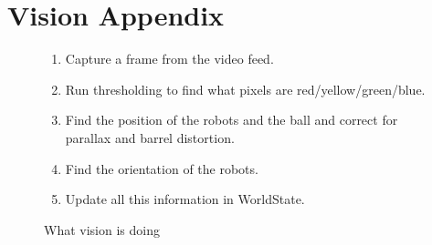 \section{Vision Appendix}
\label{apx:vision}

\begin{figure}[h!]
    \caption{What vision is doing}
    \label{overview}
    \centering
        \begin{enumerate}
            \item Capture a frame from the video feed.
            \item Run thresholding to find what pixels are red/yellow/green/blue.
            \item Find the position of the robots and the ball and correct for parallax and barrel distortion.
            \item Find the orientation of the robots.
            \item Update all this information in WorldState.
        \end{enumerate}
\end{figure}

